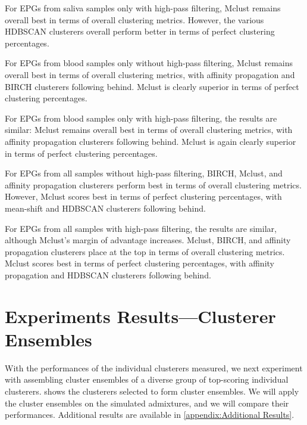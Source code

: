 For EPGs from saliva samples only with high-pass filtering, Mclust remains overall best in terms of overall clustering metrics. However, the various HDBSCAN clusterers overall perform better in terms of perfect clustering percentages.

For EPGs from blood samples only without high-pass filtering, Mclust remains overall best in terms of overall clustering metrics, with affinity propagation and BIRCH clusterers following behind. Mclust is clearly superior in terms of perfect clustering percentages.

For EPGs from blood samples only with high-pass filtering, the results are similar: Mclust remains overall best in terms of overall clustering metrics, with affinity propagation clusterers following behind. Mclust is again clearly superior in terms of perfect clustering percentages.

For EPGs from all samples without high-pass filtering, BIRCH, Mclust, and affinity propagation clusterers perform best in terms of overall clustering metrics. However, Mclust scores best in terms of perfect clustering percentages, with mean-shift and HDBSCAN clusterers following behind.

For EPGs from all samples with high-pass filtering, the results are similar, although Mclust's margin of advantage increases. Mclust, BIRCH, and affinity propagation clusterers place at the top in terms of overall clustering metrics. Mclust scores best in terms of perfect clustering percentages, with affinity propagation and HDBSCAN clusterers following behind.

\section{Experiments Results---Clusterer Ensembles}

With the performances of the individual clusterers measured, we next experiment with assembling cluster ensembles of a diverse group of top-scoring individual clusterers.  shows the clusterers selected to form cluster ensembles. We will apply the cluster ensembles on the simulated admixtures, and we will compare their performances. Additional results are available in \cref{appendix:Additional Results}.

